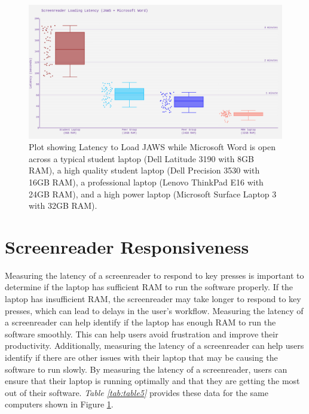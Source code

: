 \begin{figure}[H]
 \centering
 \includegraphics[width=\textwidth]{images/ComputerRBDisplaySpecsTVIFig1.png}
 
 \caption[Latency to Load JAWS]{Plot showing Latency to Load JAWS while Microsoft Word is open across a typical student laptop (Dell Latitude 3190 with 8GB RAM), a high quality student laptop (Dell Precision 3530 with 16GB RAM), a professional laptop (Lenovo ThinkPad E16 with 24GB RAM), and a high power laptop (Microsoft Surface Laptop 3 with 32GB RAM).}\label{fig:figure 1}
\end{figure}

\pagebreak
\hypertarget{screenreader-response}{}\section{Screenreader Responsiveness}\label{screenreader-response}
Measuring the latency of a screenreader to respond to key presses is important to determine if the laptop has sufficient RAM to run the software properly. If the laptop has insufficient RAM, the screenreader may take longer to respond to key presses, which can lead to delays in the user’s workflow. Measuring the latency of a screenreader can help identify if the laptop has enough RAM to run the software smoothly. This can help users avoid frustration and improve their productivity. Additionally, measuring the latency of a screenreader can help users identify if there are other issues with their laptop that may be causing the software to run slowly. By measuring the latency of a screenreader, users can ensure that their laptop is running optimally and that they are getting the most out of their software. \textit{Table \ref{tab:table5}} provides these data for the same computers shown in Figure \ref{fig:figure 1}.

\pagebreak 
 
